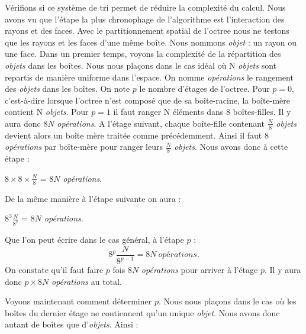 Vérifions si ce système de tri permet de réduire la complexité du calcul. Nous avons vu que l'étape la plus chronophage de l'algorithme est l'interaction des rayons et des faces. Avec le partitionnement spatial de l'\gls{octree} nous ne testons que les rayons et les faces d'une même boîte. Nous nommons \textit{objet} : un rayon ou une face. Dans un premier temps, voyons la complexité de la répartition des \textit{objets} dans les boîtes. Nous nous plaçons dans le cas idéal où N \textit{objets} sont repartis de manière uniforme dans l'espace. On nomme \textit{opérations} le rangement des \textit{objets} dans les boîtes. On note $p$ le nombre d'étages de l'\gls{octree}. Pour $p=0$, c'est-à-dire lorsque l'\gls{octree} n'est composé que de sa boîte-racine, la boîte-mère contient N \textit{objets}. Pour $p=1$ il faut ranger N éléments dans 8 boîtes-filles. Il y aura donc $8N$ \textit{opérations}. A l'étage suivant, chaque boîte-fille contenant $\frac{N}{8}$ \textit{objets} devient alors un boîte mère traitée comme précédemment. Ainsi il faut $8$ \textit{opérations} par boîte-mère pour ranger leurs $\frac{N}{8}$ \textit{objets}. Nous avons donc à cette étape :
%
\begin{center}
$8\times 8\times \frac{N}{8}$ = $8N$ \textit{opérations}.
\end{center}
%
De la même manière à l'étape suivante on aura :
\begin{center}
$8^3\frac{N}{8^2}$ = $8N$ \textit{opérations}.
\end{center}
%
Que l'on peut écrire dans le cas général, à l'étape $p$ :
\begin{equation} \label{operation}
8^p\frac{N}{8^{p-1}} = 8N \ \textit{opérations}.
\end{equation}
%
On constate qu'il faut faire $p$ fois $8N$ \textit{opérations} pour arriver à l'étage $p$. Il y aura donc $p \times 8N$ \textit{opérations} au total. %

Voyons maintenant comment déterminer $p$. Nous nous plaçons dans le cas où les boîtes du dernier étage ne contiennent qu'un unique \textit{objet}. Nous avons donc autant de boîtes que d'\textit{objets}. Ainsi :

